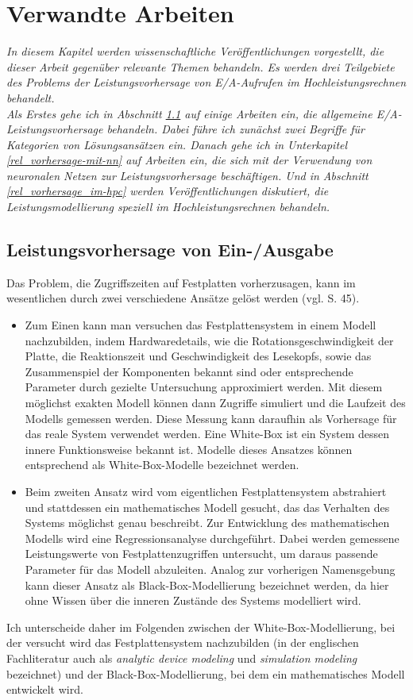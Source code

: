 \documentclass[
	12pt,
	a4paper,
	BCOR10mm,
	DIV14,
	listof=totoc,
	bibliography=totoc,
	headsepline
]{scrreprt}
\begin{document}
\chapter{Verwandte Arbeiten}
\textit{%
	In diesem Kapitel werden wissenschaftliche Veröffentlichungen vorgestellt, die dieser Arbeit gegenüber relevante Themen behandeln. Es werden drei Teilgebiete des Problems der Leistungsvorhersage von E/A-Aufrufen im Hochleistungsrechnen behandelt.\\
	Als Erstes gehe ich in Abschnitt \ref{rel_ea-vorhersage} auf einige Arbeiten ein, die allgemeine E/A-Leistungsvorhersage behandeln. Dabei führe ich zunächst zwei Begriffe für Kategorien von Lösungsansätzen ein. Danach gehe ich in Unterkapitel \ref{rel_vorhersage-mit-nn} auf Arbeiten ein, die sich mit der Verwendung von neuronalen Netzen zur Leistungsvorhersage beschäftigen.
	Und in Abschnitt \ref{rel_vorhersage_im-hpc} werden Veröffentlichungen diskutiert, die Leistungsmodellierung speziell im Hochleistungsrechnen behandeln.
}
\bigskip

\section{Leistungsvorhersage von Ein-/Ausgabe}
\label{rel_ea-vorhersage}
Das Problem, die Zugriffszeiten auf Festplatten vorherzusagen, kann im wesentlichen durch zwei verschiedene Ansätze gelöst werden (vgl. \cite{Crume:2013:FML:2538542.2538561} S. 45).
\begin{itemize}
\item  Zum Einen kann man versuchen das Festplattensystem in einem Modell nachzubilden, indem Hardwaredetails, wie die Rotationsgeschwindigkeit der Platte, die Reaktionszeit und Geschwindigkeit des Lesekopfs, sowie das Zusammenspiel der Komponenten bekannt sind oder entsprechende Parameter durch gezielte Untersuchung approximiert werden. Mit diesem möglichst exakten Modell können dann Zugriffe simuliert und die Laufzeit des Modells gemessen werden. Diese Messung kann daraufhin als Vorhersage für das reale System verwendet werden. Eine White-Box ist ein System dessen innere Funktionsweise bekannt ist. Modelle dieses Ansatzes können entsprechend als White-Box-Modelle bezeichnet werden.
\item Beim zweiten Ansatz wird vom eigentlichen Festplattensystem abstrahiert und stattdessen ein mathematisches Modell gesucht, das das Verhalten des Systems möglichst genau beschreibt.
Zur Entwicklung des mathematischen Modells wird eine Regressionsanalyse durchgeführt. Dabei werden gemessene Leistungswerte von Festplattenzugriffen untersucht, um daraus passende Parameter für das Modell abzuleiten. Analog zur vorherigen Namensgebung kann dieser Ansatz als Black-Box-Modellierung bezeichnet werden, da hier ohne Wissen über die inneren Zustände des Systems modelliert wird.
\end{itemize}
Ich unterscheide daher im Folgenden zwischen der White-Box-Modellierung, bei der versucht wird das Festplattensystem nachzubilden (in der englischen Fachliteratur auch als \textit{analytic device modeling} und \textit{simulation modeling} bezeichnet) und der Black-Box-Modellierung, bei dem ein mathematisches Modell entwickelt wird.
\end{document}
